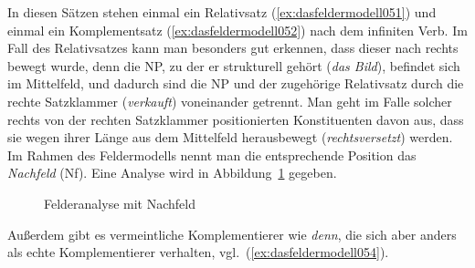 \begin{exe}
  \ex\label{ex:dasfeldermodell050}
  \begin{xlist}
  \end{xlist}
\end{exe}


In diesen Sätzen stehen einmal ein Relativsatz (\ref{ex:dasfeldermodell051}) und einmal ein Komplementsatz (\ref{ex:dasfeldermodell052}) nach dem infiniten Verb.
Im Fall des Relativsatzes kann man besonders gut erkennen, dass dieser nach rechts bewegt wurde, denn die NP, zu der er strukturell gehört (\textit{das Bild}), befindet sich im Mittelfeld, und dadurch sind die NP und der zugehörige Relativsatz durch die rechte Satzklammer (\textit{verkauft}) voneinander getrennt.
Man geht im Falle solcher rechts von der rechten Satzklammer positionierten Konstituenten davon aus, dass sie wegen ihrer Länge aus dem Mittelfeld herausbewegt (\textit{rechtsversetzt}) werden.
Im Rahmen des Feldermodells nennt man die entsprechende Position das \textit{Nachfeld} (Nf).
Eine Analyse wird in Abbildung~\ref{fig:dasfeldermodell053} gegeben.


\begin{figure}[!htbp]
  \centering
  \caption{Felderanalyse mit Nachfeld}
  \label{fig:dasfeldermodell053}
\end{figure}

Außerdem gibt es vermeintliche Komplementierer wie \textit{denn}, die sich aber anders als echte Komplementierer verhalten, vgl.\ (\ref{ex:dasfeldermodell054}).

\begin{exe}
  \ex\label{ex:dasfeldermodell054}
  \begin{xlist}
  \end{xlist}
\end{exe}

